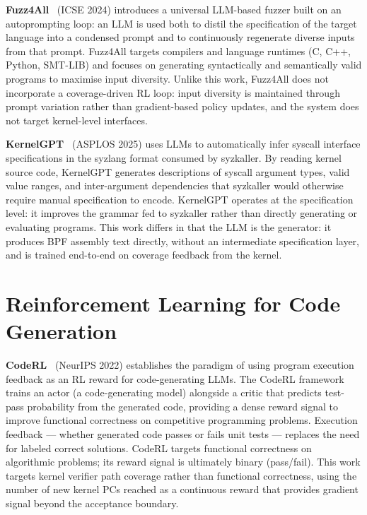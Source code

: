 \textbf{Fuzz4All}~\cite{fuzz4all} (ICSE 2024) introduces a universal LLM-based
fuzzer built on an autoprompting loop: an LLM is used both to distil the
specification of the target language into a condensed prompt and to continuously
regenerate diverse inputs from that prompt.
Fuzz4All targets compilers and language runtimes (C, C++, Python, SMT-LIB) and
focuses on generating syntactically and semantically valid programs to maximise
input diversity.
Unlike this work, Fuzz4All does not incorporate a coverage-driven RL loop: input
diversity is maintained through prompt variation rather than gradient-based
policy updates, and the system does not target kernel-level interfaces.

\textbf{KernelGPT}~\cite{kernelgpt} (ASPLOS 2025) uses LLMs to automatically
infer syscall interface specifications in the syzlang format consumed by syzkaller.
By reading kernel source code, KernelGPT generates descriptions of syscall
argument types, valid value ranges, and inter-argument dependencies that
syzkaller would otherwise require manual specification to encode.
KernelGPT operates at the specification level: it improves the grammar fed to
syzkaller rather than directly generating or evaluating programs.
This work differs in that the LLM is the generator: it produces BPF assembly text
directly, without an intermediate specification layer, and is trained end-to-end
on coverage feedback from the kernel.

\section{Reinforcement Learning for Code Generation}
\label{sec:rw-rl-code}

\textbf{CodeRL}~\cite{coderl} (NeurIPS 2022) establishes the paradigm of using
program execution feedback as an RL reward for code-generating LLMs.
The CodeRL framework trains an actor (a code-generating model) alongside a critic
that predicts test-pass probability from the generated code, providing a dense
reward signal to improve functional correctness on competitive programming
problems.
Execution feedback --- whether generated code passes or fails unit tests ---
replaces the need for labeled correct solutions.
CodeRL targets functional correctness on algorithmic problems; its reward signal
is ultimately binary (pass/fail).
This work targets kernel verifier path coverage rather than functional
correctness, using the number of new kernel PCs reached as a continuous reward
that provides gradient signal beyond the acceptance boundary.

